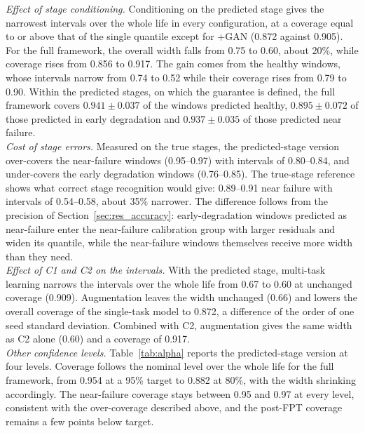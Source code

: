 \documentclass[review]{elsarticle}
\begin{document}
\textit{Effect of stage conditioning.} Conditioning on the predicted
stage gives the narrowest intervals over the whole life in every
configuration, at a coverage equal to or above that of the single
quantile except for +GAN (0.872 against 0.905). For the full framework, the overall width falls from 0.75 to
0.60, about 20\%, while coverage rises from 0.856 to 0.917. The gain
comes from the healthy windows, whose intervals narrow from 0.74 to
0.52 while their coverage rises from 0.79 to 0.90. Within the predicted
stages, on which the guarantee is defined, the full framework covers
$0.941 \pm 0.037$ of the windows predicted healthy,
$0.895 \pm 0.072$ of those predicted in early degradation and
$0.937 \pm 0.035$ of those predicted near failure.\\

\textit{Cost of stage errors.} Measured on the true stages, the
predicted-stage version over-covers the near-failure windows
(0.95--0.97) with intervals of 0.80--0.84, and under-covers the early
degradation windows (0.76--0.85). The true-stage reference shows what
correct stage recognition would give: 0.89--0.91 near failure with
intervals of 0.54--0.58, about 35\% narrower. The difference follows
from the precision of Section~\ref{sec:res_accuracy}: early-degradation
windows predicted as near-failure enter the near-failure calibration
group with larger residuals and widen its quantile, while the
near-failure windows themselves receive more width than they need.\\

\textit{Effect of C1 and C2 on the intervals.} With the predicted
stage, multi-task learning narrows the intervals over the whole life
from 0.67 to 0.60 at unchanged coverage (0.909). Augmentation leaves
the width unchanged (0.66) and lowers the overall coverage of the
single-task model to 0.872, a difference of the order of one seed
standard deviation. Combined with C2, augmentation gives the same
width as C2 alone (0.60) and a coverage of 0.917.\\

\textit{Other confidence levels.} Table~\ref{tab:alpha} reports the
predicted-stage version at four levels. Coverage follows the nominal
level over the whole life for the full framework, from 0.954 at a 95\%
target to 0.882 at 80\%, with the width shrinking accordingly. The
near-failure coverage stays between 0.95 and 0.97 at every level,
consistent with the over-coverage described above, and the post-FPT
coverage remains a few points below target.
\end{document}
